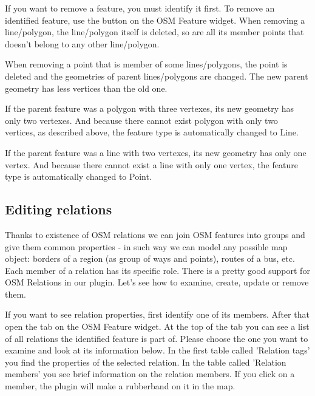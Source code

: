 
If you want to remove a feature, you must identify it first. To remove
an identified feature, use the  button on the OSM Feature widget. When removing a line/polygon,
the line/polygon itself is deleted, so are all its member points that
doesn't belong to any other line/polygon.

When removing a point that is member of some lines/polygons, the point is
deleted and the geometries of parent lines/polygons are changed. The new
parent geometry has less vertices than the old one.

If the parent feature was a polygon with three vertexes, its new geometry
has only two vertexes. And because there cannot exist polygon with only two
vertices, as described above, the feature type is automatically changed to
Line.

If the parent feature was a line with two vertexes, its new geometry has
only one vertex. And because there cannot exist a line with only one vertex,
the feature type is automatically changed to Point.

\subsection{Editing relations}\label{editing_osm_relation}

Thanks to existence of OSM relations we can join OSM features into groups and
give them common properties - in such way we can model any possible map
object: borders of a region (as group of ways and points), routes of a bus,
etc. Each member of a relation has its specific role. There is a pretty good
support for OSM Relations in our plugin. Let's see how to examine, create,
update or remove them.

\label{examrelation}

If you want to see relation properties, first identify one of its members.
After that open the  tab on the OSM Feature widget. At the
top of the tab you can see a list of all relations the identified feature
is part of. Please choose the one you want to examine and look at its
information below. In the first table called 'Relation tags' you find the
properties of the selected relation. In the table called 'Relation members'
you see brief information on the relation members. If you click on a member,
the plugin will make a rubberband on it in the map.

